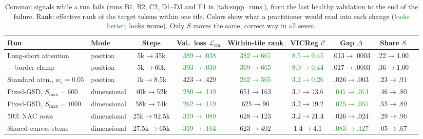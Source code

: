 \begin{table}[t]
  \centering
  \small
  \setlength{\tabcolsep}{3.6pt}
  \caption{Common signals while a run fails (runs B1, B2, C2, D1--D3 and E1 in \cref{tab:supp_runs}), from the last healthy validation to the end of the failure. Rank: effective rank of the target tokens within one tile. Colors show what a practitioner would read into each change (\textcolor{ForestGreen}{looks better}, \textcolor{BrickRed}{looks worse}). Only $S$ moves the same, correct way in all seven.}
  \label{tab:signals}
  \begin{tabular}{@{}llccccccc@{}}
    \toprule
    Run & Mode & Steps & Val.\ loss $\mathcal{L}_{\text{cm}}$ & Within-tile rank & VICReg $\mathcal{C}$ & Gap $\Delta$ & Share $S$ \\
    \midrule
    Long-short attention~\cite{zhu2021long} & position    & 5k$\to$35k    & \textcolor{ForestGreen}{.389$\to$.038} & \textcolor{ForestGreen}{382$\to$667} & \textcolor{ForestGreen}{8.5$\to$0.45} & \textcolor{BrickRed}{.013$\to$.0003} & \textcolor{BrickRed}{.22$\to$1.00} \\
    \quad + border clamp                    & position    & 5k$\to$60k    & \textcolor{ForestGreen}{.393$\to$.030} & \textcolor{ForestGreen}{369$\to$665} & \textcolor{ForestGreen}{8.0$\to$0.44} & \textcolor{BrickRed}{.017$\to$.0003} & \textcolor{BrickRed}{.36$\to$1.00} \\
    Standard attn., $w_c{=}0.05$            & position    & 1k$\to$8.5k   & .423$\to$.429                          & \textcolor{ForestGreen}{262$\to$505} & \textcolor{ForestGreen}{3.2$\to$0.26} & \textcolor{BrickRed}{.026$\to$.003}  & \textcolor{BrickRed}{.23$\to$.91} \\
    \midrule
    Fixed-GSD, $S_{\max}{=}600$             & dimensional & 40k$\to$52k   & \textcolor{ForestGreen}{.280$\to$.149} & \textcolor{BrickRed}{651$\to$163}    & \textcolor{BrickRed}{3.7$\to$13.6}    & \textcolor{ForestGreen}{.047$\to$.074} & \textcolor{BrickRed}{.46$\to$.80} \\
    Fixed-GSD, $S_{\max}{=}1000$            & dimensional & 58k$\to$74k   & \textcolor{ForestGreen}{.262$\to$.119} & \textcolor{BrickRed}{625$\to$90}     & \textcolor{BrickRed}{3.2$\to$19.2}    & \textcolor{ForestGreen}{.025$\to$.051} & \textcolor{BrickRed}{.55$\to$.89} \\
    50\% NAC rows                           & dimensional & 25k$\to$92.5k & \textcolor{ForestGreen}{.319$\to$.089} & \textcolor{BrickRed}{628$\to$123}    & \textcolor{BrickRed}{3.2$\to$21.4}    & .026$\to$.024                          & \textcolor{BrickRed}{.29$\to$.96} \\
    Shared-canvas stems                     & dimensional & 27.5k$\to$65k & \textcolor{ForestGreen}{.339$\to$.164} & \textcolor{BrickRed}{623$\to$402}    & \textcolor{BrickRed}{1.4$\to$4.1}     & \textcolor{ForestGreen}{.083$\to$.127} & \textcolor{BrickRed}{.05$\to$.67} \\
    \bottomrule
  \end{tabular}
\end{table}

